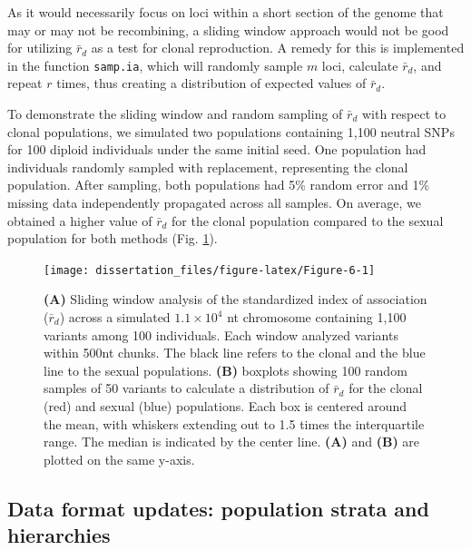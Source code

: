 \documentclass[double,12pt]{beavtex}
\begin{document}
  As it would necessarily focus on loci within a short section of the
  genome that may or may not be recombining, a sliding window approach
  would not be good for utilizing \(\bar{r}_d\) as a test for clonal
  reproduction. A remedy for this is implemented in the function
  \texttt{samp.ia}, which will randomly sample \(m\) loci, calculate
  \(\bar{r}_d\), and repeat \(r\) times, thus creating a distribution of
  expected values of \(\bar{r}_d\).
  
  To demonstrate the sliding window and random sampling of \(\bar{r}_d\)
  with respect to clonal populations, we simulated two populations
  containing 1,100 neutral SNPs for 100 diploid individuals under the same
  initial seed. One population had individuals randomly sampled with
  replacement, representing the clonal population. After sampling, both
  populations had 5\% random error and 1\% missing data independently
  propagated across all samples. On average, we obtained a higher value of
  \(\bar{r}_d\) for the clonal population compared to the sexual
  population for both methods (Fig. \ref{fig:Figure-6}).
  
  \begin{figure}
  
  {\centering \texttt{[image: dissertation\_files/figure-latex/Figure-6-1]} 
  
  }
  
  \caption[Sliding window analysis of the standardized index of association
  (\(\bar{r}_d\))]{\textbf{(A)} Sliding window analysis of the standardized index of
  association (\(\bar{r}_d\)) across a simulated \(1.1 \times 10^4\) nt
  chromosome containing 1,100 variants among 100 individuals. Each window
  analyzed variants within 500nt chunks. The black line refers to the
  clonal and the blue line to the sexual populations. \textbf{(B)}
  boxplots showing 100 random samples of 50 variants to calculate a
  distribution of \(\bar{r}_d\) for the clonal (red) and sexual (blue)
  populations. Each box is centered around the mean, with whiskers
  extending out to 1.5 times the interquartile range. The median is
  indicated by the center line. \textbf{(A)} and \textbf{(B)} are plotted
  on the same y-axis.}\label{fig:Figure-6}
  \end{figure}
  
  \subsection{Data format updates: population strata and
  hierarchies}\label{data-format-updates-population-strata-and-hierarchies}
  
\end{document}
